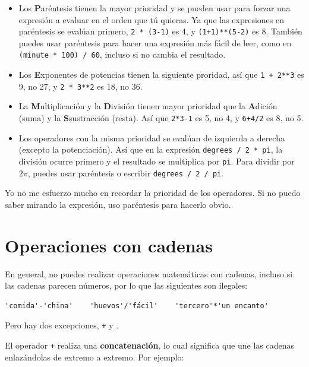 \documentclass[10pt]{book}
\begin{document}
\begin{itemize}

\item Los {\bf P}aréntesis tienen la mayor prioridad y se pueden usar 
para forzar una expresión a evaluar en el orden que tú quieras. Ya que
las expresiones en paréntesis se evalúan primero, {\tt 2 * (3-1)} es 4,
y {\tt (1+1)**(5-2)} es 8. También puedes usar paréntesis para hacer una
expresión más fácil de leer, como en {\tt (minute * 100) / 60}, incluso
si no cambia el resultado.

\item Los {\bf E}xponentes de potencias tienen la siguiente proridad, así que
{\tt 1 + 2**3} es 9, no 27, y {\tt 2 * 3**2} es 18, no 36.

\item La {\bf M}ultiplicación y la {\bf D}ivisión tienen mayor prioridad
	que la {\bf A}dición (suma) y la {\bf S}sustracción (resta).  Así que {\tt 2*3-1} es 5, no
  4, y {\tt 6+4/2} es 8, no 5.

\item Los operadores con la misma prioridad se evalúan de izquierda a
  derecha (excepto la potenciación).  Así que en la expresión {\tt degrees /
    2 * pi}, la división ocurre primero y el resultado se multiplica
  por {\tt pi}.  Para dividir por $2 \pi$, puedes usar paréntesis o escribir
  {\tt degrees / 2 / pi}.

\end{itemize}

Yo no me esfuerzo mucho en recordar la prioridad de los
operadores. Si no puedo saber mirando la expresión, uso
paréntesis para hacerlo obvio.


\section{Operaciones con cadenas}

En general, no puedes realizar operaciones matemáticas con cadenas, incluso
si las cadenas parecen números, por lo que las siguientes son ilegales:

\begin{verbatim}
'comida'-'china'    'huevos'/'fácil'    'tercero'*'un encanto'
\end{verbatim}
%
Pero hay dos excepciones, {\tt +} y {\tt *}.

El operador {\tt +} realiza una {\bf concatenación}, lo cual significa que
une las cadenas enlazándolas de extremo a extremo.  Por ejemplo:
\end{document}
